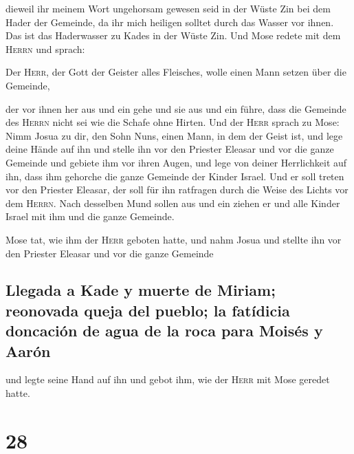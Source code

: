  dieweil ihr meinem Wort ungehorsam gewesen seid in der
Wüste Zin bei dem Hader der Gemeinde, da ihr mich heiligen solltet durch
das Wasser vor ihnen. Das ist das Haderwasser zu Kades in der Wüste Zin.
 Und Mose redete mit dem \textsc{Herrn} und sprach:

 Der \textsc{Herr}, der Gott der Geister alles Fleisches,
wolle einen Mann setzen über die Gemeinde,

 der vor ihnen her aus und ein gehe und sie aus und ein
führe, dass die Gemeinde des \textsc{Herrn} nicht sei wie die Schafe
ohne Hirten.  Und der \textsc{Herr} sprach zu Mose: Nimm
Josua zu dir, den Sohn Nuns, einen Mann, in dem der Geist ist, und lege
deine Hände auf ihn  und stelle ihn vor den Priester
Eleasar und vor die ganze Gemeinde und gebiete ihm vor ihren Augen,
 und lege von deiner Herrlichkeit auf ihn, dass ihm
gehorche die ganze Gemeinde der Kinder Israel.  Und er
soll treten vor den Priester Eleasar, der soll für ihn ratfragen durch
die Weise des Lichts vor dem \textsc{Herrn}. Nach desselben Mund sollen
aus und ein ziehen er und alle Kinder Israel mit ihm und die ganze
Gemeinde.

 Mose tat, wie ihm der \textsc{Herr} geboten hatte, und
nahm Josua und stellte ihn vor den Priester Eleasar und vor die ganze
Gemeinde

\hypertarget{llegada-a-kade-y-muerte-de-miriam-reonovada-queja-del-pueblo-la-fatuxeddicia-doncaciuxf3n-de-agua-de-la-roca-para-moisuxe9s-y-aaruxf3n}{%
\subsection{Llegada a Kade y muerte de Miriam; reonovada queja del
pueblo; la fatídicia doncación de agua de la roca para Moisés y
Aarón}\label{llegada-a-kade-y-muerte-de-miriam-reonovada-queja-del-pueblo-la-fatuxeddicia-doncaciuxf3n-de-agua-de-la-roca-para-moisuxe9s-y-aaruxf3n}}

 und legte seine Hand auf ihn und gebot ihm, wie der
\textsc{Herr} mit Mose geredet hatte.

\hypertarget{section-27}{%
\section{28}\label{section-27}}

